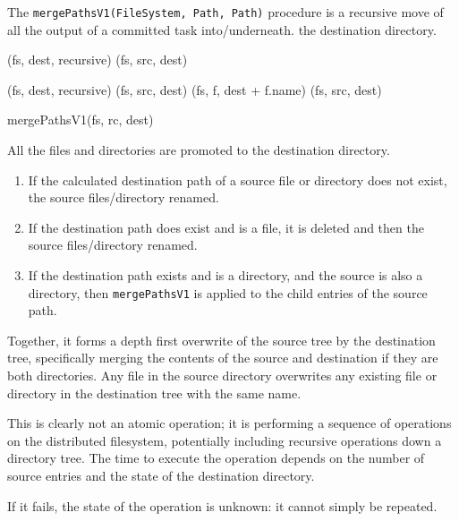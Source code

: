 \documentclass[conference]{IEEEtran}
\begin{document}
The \texttt{mergePathsV1(FileSystem, Path, Path)} procedure is
a recursive move of all the output of a committed task into/underneath.
the destination directory.

\begin{procedure*}
\FileOutputCommitVars


 {
   {
    \delete(fs, dest, recursive)\;
  }
  \rename(fs, src, dest)\;
} {
   {
     {
      \delete(fs, dest, recursive)\;
      \rename(fs, src, dest)\;
    } {
       {
       (fs, f, dest + f.name)\;
      }
    }
  } {
    \rename(fs, src, dest)\;
  }

\caption{mergePathsV1(fs, rc, dest)}
\label{alg:mergePathsV1}
}

\end{procedure*}

All the files and directories are promoted to the destination directory.

\begin{enumerate}
  \item If the calculated destination path of a source file or directory does
  not exist, the source files/directory renamed.
  \item If the destination path does exist and is a file, it is deleted and then
  the source files/directory renamed.
  \item If the destination path exists and is a directory, and the source
  is also a directory, then \texttt{mergePathsV1} is applied to the child
  entries of the source path.
\end{enumerate}

Together, it forms a depth first overwrite of the source tree by the destination
tree, specifically merging the contents of the source and destination if they
are both directories.
Any file in the source directory overwrites any existing file or directory
in the destination tree with the same name.


This is clearly not an atomic operation;
it is performing a sequence of operations on the distributed filesystem,
potentially including recursive operations down a directory tree.
The time to execute the operation depends on the number of source entries
and the state of the destination directory.

If it fails, the state of the operation is unknown: it cannot simply
be repeated.
\end{document}
